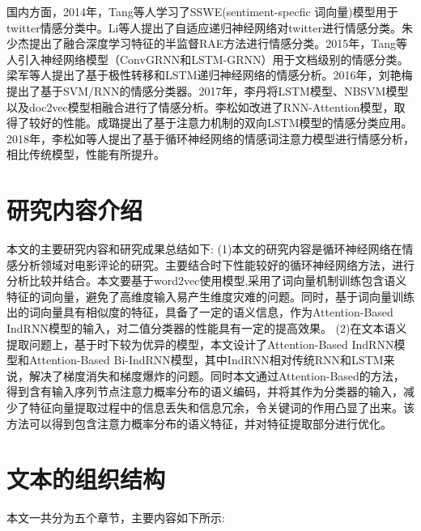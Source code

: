 \documentclass[a4paper,AutoFakeBold,oneside,12pt]{book}
\begin{document}
国内方面，2014年，Tang等人学习了SSWE(sentiment-specfic 词向量)模型用于twitter情感分类中\cite{tangLearningSentimentSpecificWord2014}。Li等人提出了自适应递归神经网络对twitter进行情感分类\cite{dongAdaptiveRecursiveNeural2014}。朱少杰提出了融合深度学习特征的半监督RAE方法进行情感分类\cite{zhushaojieJiYuShenDuXueXiDeWenBenQingGanFenLeiYanJiu2014}。2015年，Tang等人引入神经网络模型（ConvGRNN和LSTM-GRNN）用于文档级别的情感分类\cite{tangDocumentModelingGated2015}。梁军等人提出了基于极性转移和LSTM递归神经网络的情感分析\cite{liangjunJiYuJiXingZhuanYiHeLSTMDiGuiWangLuoDeQingGanFenXi2015}。2016年，刘艳梅提出了基于SVM/RNN的情感分类器\cite{liuyanmeiShenDuXueXiJiZhuXiaDeZhongWenWeiBoQingGanDeFenXiYuYanJiu2016}。2017年，李丹将LSTM模型、NBSVM模型以及doc2vec模型相融合进行了情感分析\cite{lidanJiYuChangDuanShiJiYiWangLuoDeZhongWenWenBenQingGanFenXi2017}。李松如改进了RNN-Attention模型，取得了较好的性能\cite{lisongruJiYuXunHuanShenJingWangLuoDeWangLuoYuQingWenBenQingGanFenXiJiZhuYanJiu2017}。成璐提出了基于注意力机制的双向LSTM模型的情感分类应用\cite{chengluJiYuZhuYiLiJiZhiDeShuangXiangLSTMMoXingZaiZhongWenShangPinPingLunQingGanFenLeiZhongDeYanJiu2017}。2018年，李松如等人提出了基于循环神经网络的情感词注意力模型进行情感分析，相比传统模型，性能有所提升\cite{lisongruCaiYongXunHuanShenJingWangLuoDeQingGanFenXiZhuYiLiMoXing2018}。


\section{研究内容介绍}

本文的主要研究内容和研究成果总结如下:
(1)本文的研究内容是循环神经网络在情感分析领域对电影评论的研究。主要结合时下性能较好的循环神经网络方法，进行分析比较并结合。本文要基于word2vec使用模型,采用了词向量机制训练包含语义特征的词向量，避免了高维度输入易产生维度灾难的问题。同时，基于词向量训练出的词向量具有相似度的特征，具备了一定的语义信息，作为Attention-Based IndRNN模型的输入，对二值分类器的性能具有一定的提高效果。
(2)在文本语义提取问题上，基于时下较为优异的模型，本文设计了Attention-Based IndRNN模型和Attention-Based Bi-IndRNN模型，其中IndRNN相对传统RNN和LSTM来说，解决了梯度消失和梯度爆炸的问题。同时本文通过Attention-Based的方法，得到含有输入序列节点注意力概率分布的语义编码，并将其作为分类器的输入，减少了特征向量提取过程中的信息丢失和信息冗余，令关键词的作用凸显了出来。该方法可以得到包含注意力概率分布的语义特征，并对特征提取部分进行优化。


\section{文本的组织结构}
本文一共分为五个章节，主要内容如下所示:
\end{document}
